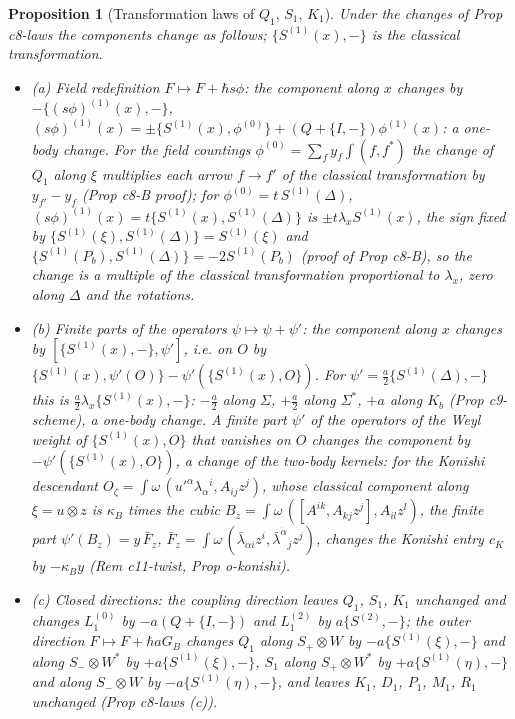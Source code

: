 \documentclass[11pt]{article}
\numberwithin{equation}{section}
\theoremstyle{plain}
\newtheorem{proposition}[theorem]{Proposition}
\theoremstyle{definition}
\begin{document}
\begin{proposition}[Transformation laws of $Q_1$, $S_1$, $K_1$]
\label{prop:qs-laws}
Under the changes of Prop c8-laws the components change as follows; $\{S^{(1)}(x),-\}$ is the classical transformation.
\begin{itemize}
\item (a) Field redefinition $F\mapsto F+\hbar s\phi$: the component along $x$ changes by $-\{(s\phi)^{(1)}(x),-\}$, $(s\phi)^{(1)}(x)=\pm\{S^{(1)}(x),\phi^{(0)}\}+(Q+\{I,-\})\phi^{(1)}(x)$: a one-body change. For the field countings $\phi^{(0)}=\sum_fy_f\int(f,f^*)$ the change of $Q_1$ along $\xi$ multiplies each arrow $f\to f'$ of the classical transformation by $y_{f'}-y_f$ (Prop c8-B proof); for $\phi^{(0)}=t\,S^{(1)}(\Delta)$, $(s\phi)^{(1)}(x)=t\{S^{(1)}(x),S^{(1)}(\Delta)\}$ is $\pm t\lambda_x S^{(1)}(x)$, the sign fixed by $\{S^{(1)}(\xi),S^{(1)}(\Delta)\}=S^{(1)}(\xi)$ and $\{S^{(1)}(P_b),S^{(1)}(\Delta)\}=-2S^{(1)}(P_b)$ (proof of Prop c8-B), so the change is a multiple of the classical transformation proportional to $\lambda_x$, zero along $\Delta$ and the rotations.
\item (b) Finite parts of the operators $\psi\mapsto\psi+\psi'$: the component along $x$ changes by $[\{S^{(1)}(x),-\},\psi']$, i.e. on $O$ by $\{S^{(1)}(x),\psi'(O)\}-\psi'(\{S^{(1)}(x),O\})$. For $\psi'=\tfrac a2\{S^{(1)}(\Delta),-\}$ this is $\tfrac a2\lambda_x\{S^{(1)}(x),-\}$: $-\tfrac a2$ along $\Sigma$, $+\tfrac a2$ along $\Sigma^*$, $+a$ along $K_b$ (Prop c9-scheme), a one-body change. A finite part $\psi'$ of the operators of the Weyl weight of $\{S^{(1)}(x),O\}$ that vanishes on $O$ changes the component by $-\psi'(\{S^{(1)}(x),O\})$, a change of the two-body kernels: for the Konishi descendant $O_\zeta=\int\omega\,(u'^\alpha\lambda_\alpha{}^i,A_{ij}z^j)$, whose classical component along $\xi=u\otimes z$ is $\kappa_B$ times the cubic $B_z=\int\omega\,([A^{ik},A_{kj}z^j],A_{il}z^l)$, the finite part $\psi'(B_z)=y\,\bar F_z$, $\bar F_z=\int\omega\,(\bar\lambda_{\dot\alpha i}z^i,\bar\lambda^{\dot\alpha}{}_jz^j)$, changes the Konishi entry $c_K$ by $-\kappa_By$ (Rem c11-twist, Prop o-konishi).
\item (c) Closed directions: the coupling direction leaves $Q_1$, $S_1$, $K_1$ unchanged and changes $L_1^{(0)}$ by $-a(Q+\{I,-\})$ and $L_1^{(2)}$ by $a\{S^{(2)},-\}$; the outer direction $F\mapsto F+\hbar aG_B$ changes $Q_1$ along $S_+\otimes W$ by $-a\{S^{(1)}(\xi),-\}$ and along $S_-\otimes W^*$ by $+a\{S^{(1)}(\xi),-\}$, $S_1$ along $S_+\otimes W^*$ by $+a\{S^{(1)}(\eta),-\}$ and along $S_-\otimes W$ by $-a\{S^{(1)}(\eta),-\}$, and leaves $K_1$, $D_1$, $P_1$, $M_1$, $R_1$ unchanged (Prop c8-laws (c)).

\end{itemize}
\end{proposition}
\end{document}
